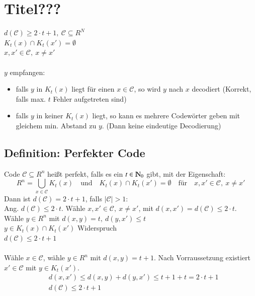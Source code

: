 \section{Titel???}

$d(\mathcal{C}) \geq 2 \cdot t + 1,\ \mathcal{C} \subseteq R^N$ \\
$K_t(x) \cap K_t(x')=\emptyset$ \\
$x, x' \in \mathcal{C},\ x \neq x'$ \\
\\
$y$ empfangen:
\begin{itemize}
\item falls $y$ in $K_t(x)$ liegt f\"ur einen $x \in \mathcal{C}$, so wird $y$ nach $x$ decodiert (Korrekt, falls max. $t$ Fehler aufgetreten sind)
\item  falls $y$ in keiner $K_t(x)$ liegt, so kann es mehrere Codew\"orter geben mit gleichem min. Abstand zu $y$. (Dann keine eindeutige  Decodierung)
\end{itemize}

\subsection{Definition: Perfekter Code}
Code $\mathcal{C} \subseteq R^n$ hei\ss t perfekt, falls es ein $t \in \N_0$ gibt, mit der Eigenschaft:
\[
	R^n = \bigcup_{x \in \mathcal{C}} K_t(x) \quad \text{und} \quad K_t(x) \cap K_t(x') = \emptyset \quad \text{f\"ur}\quad x,x' \in \mathcal{C},\ x \neq x'
\]
Dann ist $d(\mathcal{C})=2 \cdot t + 1$, falls $\left| \mathcal{C} \right| > 1$: \\
Ang. $d(\mathcal{C}) \leq 2\cdot t$. W\"ahle $x,x' \in \mathcal{C},\ x \neq x'$, mit $d(x,x') = d(\mathcal{C}) \leq 2 \cdot t$. \\
W\"ahle $y \in R^n$ mit $d(x,y)=t,\ d(y,x') \leq t$\\
$y \in K_t(x) \cap K_t(x')$ Widerspruch\\
$d(\mathcal{C}) \leq 2 \cdot t + 1$ \\
\\
W\"ahle $x \in \mathcal{C}$, w\"ahle $y \in R^n$ mit $d(x,y)=t+1$. Nach Vorraussetzung existiert $x' \in \mathcal{C}$ mit $y \in K_t(x')$. 
\begin{align*}
	&d(x,x') \leq d(x,y) + d(y,x') \leq t+1+t = 2 \cdot t + 1 \\
	&d(\mathcal{C}) \leq 2\cdot t + 1
\end{align*}	

